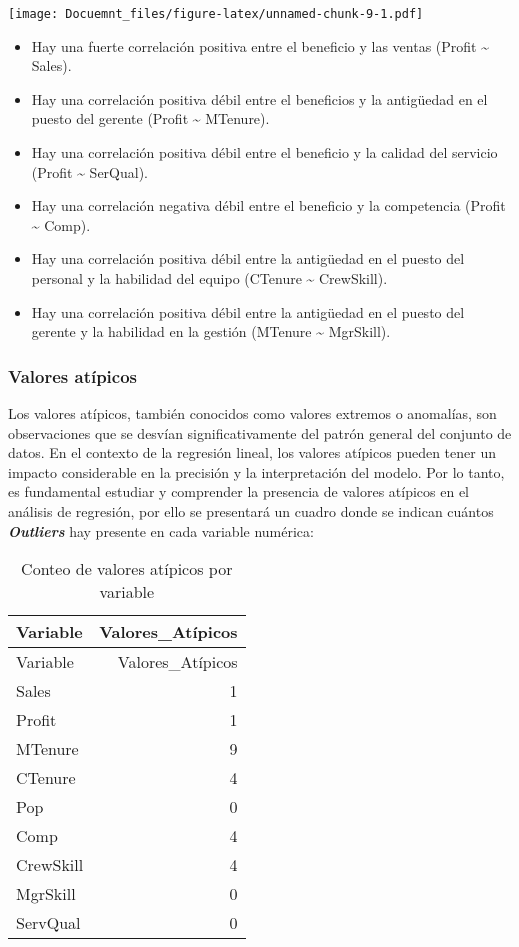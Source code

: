 \documentclass[
]{article}
\providecommand{\tightlist}{%
  \setlength{\itemsep}{0pt}\setlength{\parskip}{0pt}}
\begin{document}
\texttt{[image: Docuemnt\_files/figure-latex/unnamed-chunk-9-1.pdf]}

\begin{itemize}
\tightlist
\item
  Hay una fuerte correlación positiva entre el beneficio y las ventas
  (Profit \textasciitilde{} Sales).
\item
  Hay una correlación positiva débil entre el beneficios y la antigüedad
  en el puesto del gerente (Profit \textasciitilde{} MTenure).
\item
  Hay una correlación positiva débil entre el beneficio y la calidad del
  servicio (Profit \textasciitilde{} SerQual).
\item
  Hay una correlación negativa débil entre el beneficio y la competencia
  (Profit \textasciitilde{} Comp).
\item
  Hay una correlación positiva débil entre la antigüedad en el puesto
  del personal y la habilidad del equipo (CTenure \textasciitilde{}
  CrewSkill).
\item
  Hay una correlación positiva débil entre la antigüedad en el puesto
  del gerente y la habilidad en la gestión (MTenure \textasciitilde{}
  MgrSkill).
\end{itemize}

\hypertarget{valores-atuxedpicos}{%
\subsubsection{Valores atípicos}\label{valores-atuxedpicos}}

Los valores atípicos, también conocidos como valores extremos o
anomalías, son observaciones que se desvían significativamente del
patrón general del conjunto de datos. En el contexto de la regresión
lineal, los valores atípicos pueden tener un impacto considerable en la
precisión y la interpretación del modelo. Por lo tanto, es fundamental
estudiar y comprender la presencia de valores atípicos en el análisis de
regresión, por ello se presentará un cuadro donde se indican cuántos
\textbf{\emph{Outliers}} hay presente en cada variable numérica:

\begin{longtable}[]{@{}lr@{}}
\caption{Conteo de valores atípicos por variable}\tabularnewline
\toprule\noalign{}
Variable & Valores\_Atípicos \\
\midrule\noalign{}
\endfirsthead
\toprule\noalign{}
Variable & Valores\_Atípicos \\
\midrule\noalign{}
\endhead
\bottomrule\noalign{}
\endlastfoot
Sales & 1 \\
Profit & 1 \\
MTenure & 9 \\
CTenure & 4 \\
Pop & 0 \\
Comp & 4 \\
CrewSkill & 4 \\
MgrSkill & 0 \\
ServQual & 0 \\
\end{longtable}
\end{document}
